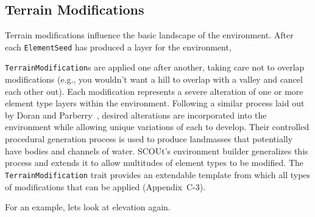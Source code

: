 \subsection{Terrain Modifications} \label{subsec:terrain_modifications}
Terrain modifications influence the basic landscape of the environment.
After each \texttt{ElementSeed} has produced a layer for the environment,

\noindent
\texttt{TerrainModification}s are applied one after another, taking care not to overlap modifications (e.g., you wouldn't want a hill to overlap with a valley and cancel each other out).
Each modification represents a severe alteration of one or more element type layers within the environment.
Following a similar process laid out by Doran and Parberry~\cite{doran_controlled_2010}, desired alterations are incorporated into the environment while allowing unique variations of each to develop.
Their controlled procedural generation process is used to produce landmasses that potentially have bodies and channels of water.
SCOUt's environment builder generalizes this process and extends it to allow multitudes of element types to be modified.
The \texttt{TerrainModification} trait provides an extendable template from which all types of modifications that can be applied (Appendix~C-3).


\noindent
For an example, lets look at elevation again.

